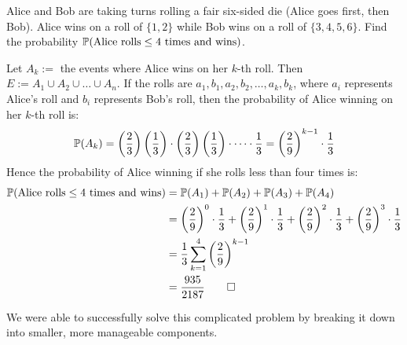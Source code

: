 \begin{example}
   Alice and Bob are taking turns rolling a fair six-sided die (Alice goes first, then Bob). Alice wins on a roll of $\{1,2\}$ while Bob wins on a roll of $\{3,4,5,6\}$. Find the probability $\mathbb{P}(\text{Alice rolls} \leq 4 \text{ times and wins})$.
\end{example}
\begin{solution}
   Let $A_k := $ the events where Alice wins on her $k$-th roll. Then $E := A_1 \cup A_2 \cup \dots \cup A_n$. If the rolls are $a_1, b_1, a_2, b_2, \dots, a_k, b_k$, where $a_i$ represents Alice's roll and $b_i$ represents Bob's roll, then the probability of Alice winning on her $k$-th roll is:
   \[ \mathbb{P}(A_k) = \left(\displaystyle\frac{2}{3}\right)\left(\displaystyle\frac{1}{3}\right) \cdot \left(\displaystyle\frac{2}{3}\right)\left(\displaystyle\frac{1}{3}\right) \cdot \dots \cdot \displaystyle\frac{1}{3} = \left(\displaystyle\frac{2}{9}\right)^{k-1} \cdot \displaystyle\frac{1}{3} \]
   Hence the probability of Alice winning if she rolls less than four times is:
   \begin{align*}
      \mathbb{P}(\text{Alice rolls} \leq 4 \text{ times and wins}) &= \mathbb{P}(A_1) + \mathbb{P}(A_2) + \mathbb{P}(A_3) + \mathbb{P}(A_4) \\
                                                            &= \left(\displaystyle\frac{2}{9}\right)^{0} \cdot \displaystyle\frac{1}{3} + \left(\displaystyle\frac{2}{9}\right)^{1} \cdot \displaystyle\frac{1}{3} + \left(\displaystyle\frac{2}{9}\right)^{2} \cdot \displaystyle\frac{1}{3} + \left(\displaystyle\frac{2}{9}\right)^{3} \cdot \displaystyle\frac{1}{3} \\
                                                            &= \displaystyle\frac{1}{3}\displaystyle\sum_{k = 1}^{4}\left(\displaystyle\frac{2}{9}\right)^{k-1} \\
                                                            &= \displaystyle\frac{935}{2187} \qedhere
   \end{align*}
\end{solution}
We were able to successfully solve this complicated problem by breaking it down into smaller, more manageable components. 
